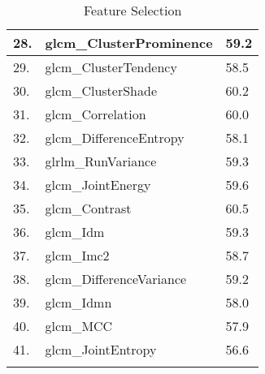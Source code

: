 \begin{longtable}[H]{|l|l|l|}
28. & glcm\_ClusterProminence & 59.2 \\ \hline
29. & glcm\_ClusterTendency & 58.5 \\ \hline
30. & glcm\_ClusterShade & 60.2 \\ \hline
31. & glcm\_Correlation & 60.0 \\ \hline
32. & glcm\_DifferenceEntropy & 58.1 \\ \hline
33. & glrlm\_RunVariance & 59.3 \\ \hline
34. & glcm\_JointEnergy & 59.6 \\ \hline
35. & glcm\_Contrast & 60.5 \\ \hline
36. & glcm\_Idm & 59.3 \\ \hline
37. & glcm\_Imc2 & 58.7 \\ \hline
38. & glcm\_DifferenceVariance & 59.2 \\ \hline
39. & glcm\_Idmn & 58.0 \\ \hline
40. & glcm\_MCC & 57.9 \\ \hline
41. & glcm\_JointEntropy & 56.6 \\ \hline
\caption{Feature Selection}
\end{longtable}








